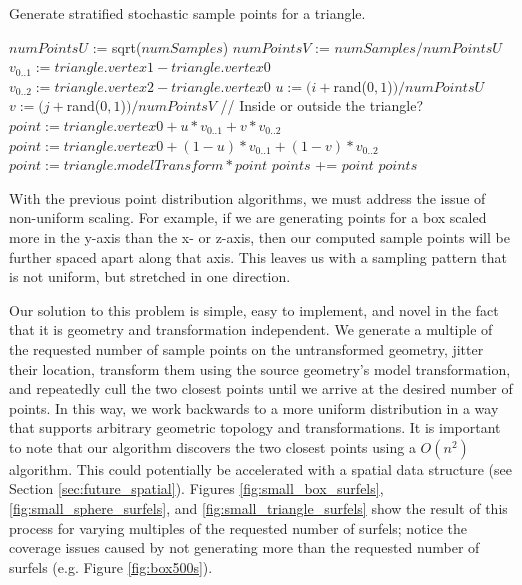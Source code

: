 \begin{algorithm}[H]
\captionfont
\caption[Triangle point generation]{Generate stratified stochastic sample points for a triangle.}
\label{alg:triangle_point_gen}
{\fontsize{10}{9}\selectfont
\begin{algorithmic}
      \State $numPointsU$ := sqrt($numSamples$)
      \State $numPointsV$ := $numSamples / numPointsU$
      \State $v_{0..1} := triangle.vertex1 - triangle.vertex0$
      \State $v_{0..2} := triangle.vertex2 - triangle.vertex0$
            \State $u := (i + $rand($0,1$)$) / numPointsU$
            \State $v := (j + $rand($0,1$)$) / numPointsV$
            \State // Inside or outside the triangle?
               \State $point := triangle.vertex0 + u*v_{0..1} + v*v_{0..2}$
            \Else
               \State $point := triangle.vertex0 + (1-u)*v_{0..1} + (1-v)*v_{0..2}$
            \EndIf
            \State $point := triangle.modelTransform * point$
            \State $points$ += $point$
         \EndFor
      \EndFor
      \State \Return $points$
   \EndFunction
\end{algorithmic}
}
\end{algorithm}

With the previous point distribution algorithms, we must address the issue of non-uniform scaling. For example, if we are generating points for a box scaled more in the y-axis than the x- or z-axis, then our computed sample points will be further spaced apart along that axis. This leaves us with a sampling pattern that is not uniform, but stretched in one direction.

Our solution to this problem is simple, easy to implement, and novel in the fact that it is geometry and transformation independent. We generate a multiple of the requested number of sample points on the untransformed geometry, jitter their location, transform them using the source geometry's model transformation, and repeatedly cull the two closest points until we arrive at the desired number of points. In this way, we work backwards to a more uniform distribution in a way that supports arbitrary geometric topology and transformations. It is important to note that our algorithm discovers the two closest points using a $O(n^{2})$ algorithm. This could potentially be accelerated with a spatial data structure (see Section \ref{sec:future_spatial}). Figures \ref{fig:small_box_surfels}, \ref{fig:small_sphere_surfels}, and \ref{fig:small_triangle_surfels} show the result of this process for varying multiples of the requested number of surfels; notice the coverage issues caused by not generating more than the requested number of surfels (e.g. Figure \ref{fig:box500s}).


